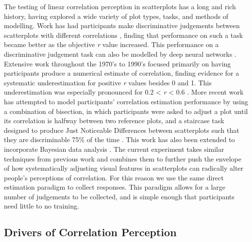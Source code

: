 \documentclass[manuscript, review, anonymous, screen]{acmart}
\begin{document}
The testing of linear correlation perception in scatterplots has a long
and rich history, having explored a wide variety of plot types, tasks,
and methods of modelling. Work has had participants make discriminative
judgements between scatterplots with different correlations
\citep{pollack_1960, doherty_2007}, finding that performance on such a
task became better as the objective \emph{r} value increased. This
performance on a discriminative judgement task can also be modelled by
deep neural networks \citep{yang_2023}. Extensive work throughout the
1970's to 1990's focused primarily on having participants produce a
numerical estimate of correlation, finding evidence for a systematic
underestimation for positive \emph{r} values besides 0 and 1. This
underestimation was especially pronounced for 0.2 \textless{} \emph{r}
\textless{} 0.6
\citep{strahan_1978, bobko_1979, cleveland_1982, lane_1985, lauer_1989, collyer_1990, meyer_1992}.
More recent work has attempted to model participants' correlation
estimation performance by using a combination of bisection, in which
participants were asked to adjust a plot until its correlation is
halfway between two reference plots, and a staircase task designed to
produce Just Noticeable Differences between scatterplots such that they
are discriminable 75\% of the time \citep{rensink_2010}. This work has
also been extended to incorporate Bayesian data analysis
\citep{kay_2015}. The current experiment takes similar techniques from
previous work \citep{strain_2023, strain_2023b} and combines them to
further push the envelope of how systematically adjusting visual
features in scatterplots can radically alter people's perceptions of
correlation. For this reason we use the same direct estimation paradigm
to collect responses. This paradigm allows for a large number of
judgements to be collected, and is simple enough that participants need
little to no training.

\hypertarget{sec-drivers}{%
\subsection{Drivers of Correlation Perception}\label{sec-drivers}}
\end{document}
